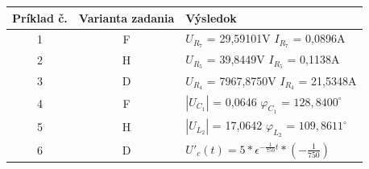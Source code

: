 \documentclass[a4paper,12pt]{article}
\begin{document}
    \begin{tabular}{|c|c|l|}
    \hline
    Príklad č.  & Varianta zadania & Výsledok                            \\ \hline
    1           & F                & $U_{R_7}$ = 29,59101V  \hspace{5mm} $I_{R_7}$ = 0,0896A \\ \hline
    2           & H                & $ U_{R_5}$ = 39,8449V \hspace{5mm}  $I_{R_5}$ = 0,1138A \\ \hline
    3           & D                & $U_{R_4}$ = 7967,8750V \hspace{2mm} $I_{R_4}$ = 21,5348A \\ \hline
    4           & F                & $|U_{C_1}|$ = 0,0646  \hspace{8mm} $\varphi_{C_1}$ = $128,8400^{\circ}$        \\ \hline
    5           & H                & $|U_{L_2}|$ = 17,0642  \hspace{7mm} $\varphi_{L_2}$ = $109,8611^{\circ}$         \\ \hline
    6           & D                & $U'_c(t) = 5 * \epsilon^{-\frac{1}{750}t} *(-\frac{1}{750})$                                  \\ \hline
    \end{tabular}
\end{document}

